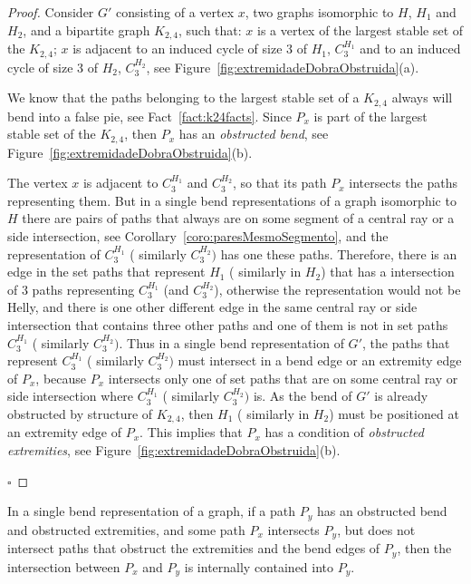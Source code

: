 \documentclass[runningheads]{llncs}
\begin{document}
\begin{proof} %
Consider $G'$ consisting of a vertex $x$, two graphs isomorphic to $H$, $ H_1 $ and $ H_2 $, and a bipartite graph $K_{2,4}$, such that: $x$ is a vertex of the largest stable set of the $K_{2,4}$; $x$ is adjacent to an induced cycle of size 3 of $H_1$, $C_3^{H_1}$ and to an induced cycle of size 3 of $H_2$, $ C_3^{H_2}$, see Figure~\ref{fig:extremidadeDobraObstruida}(a).

We know that the paths belonging to the largest stable set of a $K_{2,4}$ always will bend into a false pie, see Fact~\ref{fact:k24facts}. Since $P_{x}$ is part of the largest stable set of the $K_{2,4}$, then $P_{x}$ has an \emph {obstructed bend}, see Figure~\ref{fig:extremidadeDobraObstruida}(b). 

The vertex $x$ is adjacent to $ C_{3}^{H_1}$ and $ C_3^{H_2}$, so that its path $ P_{x} $ intersects the paths representing them.  But in a single bend representations of a graph isomorphic to $H$ there are pairs of paths that always are on some segment of a central ray or a side intersection, see Corollary~\ref{coro:paresMesmoSegmento}, and the representation of $C_{3}^{H_1}$ ( similarly $C_3^{H_2})$ has one these paths. Therefore, there is an edge in the set paths that represent ${H_1}$ ( similarly in ${H_2}$) that has a intersection of 3 paths representing $ C_{3}^{H_1}$ (and $ C_3^{H_2}$), otherwise the representation would not be Helly, and there is one other different edge in the same central ray or side intersection that contains three other paths and one of them is not in set paths  $C_{3}^{H_1}$ ( similarly $C_3^{H_2})$. Thus in a single bend representation of $G'$, the paths that represent  $C_{3}^{H_1}$ ( similarly $C_3^{H_2})$ must intersect in a bend edge or an extremity edge of $P_{x}$, because $P_{x}$ intersects only one of set paths that are on some central ray or side intersection where  $C_{3}^{H_1}$ ( similarly $C_3^{H_2})$ is. As the bend of $G'$ is already obstructed by structure of $K_{2,4}$, then ${H_1}$ ( similarly in ${H_2}$) must be positioned at an extremity edge of $P_{x}$. This implies that $ P_{x} $ has a condition of \emph{obstructed extremities}, see Figure~\ref{fig:extremidadeDobraObstruida}(b).

$\square$ \end{proof}

\begin{remark} %
In a single bend representation of a graph, if a path $P_{y}$ has an obstructed bend and obstructed extremities, and some path $P_{x}$ intersects $P_{y}$, but does not intersect paths that obstruct the extremities and the bend edges of $P_{y}$, then the intersection between $P_{x}$ and $P_{y}$ is internally contained into $P_{y}$. 
\end{remark}
\end{document}
